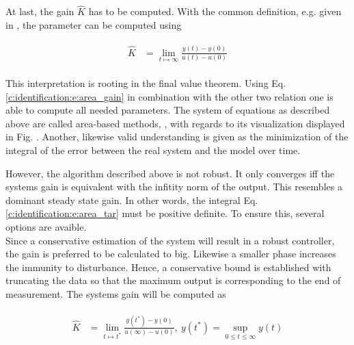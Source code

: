 At last, the gain $\hat{K}$ has to be computed. With the common definition, e.g. given in \cite[p.213]{Lunze2016}, the parameter can be computed using

\begin{align}
\begin{split}
\hat{K} &= \lim_{t\mapsto \infty} \frac{y(t)-y(0)}{u(t)-u(0)}
\end{split}
\label{c:identification:e:area_gain}
\end{align}

This interpretation is rooting in the final value theorem. Using Eq. \ref{c:identification:e:area_gain} in combination with the other two relation one is able to compute all needed parameters.\newline
The system of equations as described above are called area-based methods, \cite{Fedele2009a}, with regards to its visualization displayed in Fig. . Another, likewise valid understanding is given as the minimization of the integral of the error between the real system and the model over time.\\

\begin{figure}[h]
  \centering
  \def\svgwidth{\textwidth}
  
\end{figure}

However, the algorithm described above is not robust. It only converges iff the systems gain is equivalent with the infitity norm of the output. This resembles a dominant steady state gain. In other words, the integral Eq. \ref{c:identification:e:area_tar} must be positive definite. To ensure this, several options are avaible. \\

Since a conservative estimation of the system will result in a robust controller, the gain is preferred to be calculated to big. Likewise a smaller phase increases the immunity to disturbance. Hence, a conservative bound is established with truncating the data so that the maximum output is corresponding to the end of measurement. The systems gain will be computed as

\begin{align}
\begin{split}
\hat{K} &= \lim_{t\mapsto t^*} \frac{y(t^*)-y(0)}{u(\infty)-u(0)}, ~ y(t^*) = \sup_{0 \leq t \leq \infty} y(t)
\end{split}
\label{c:identification:e:area_sup_gain}
\end{align}

